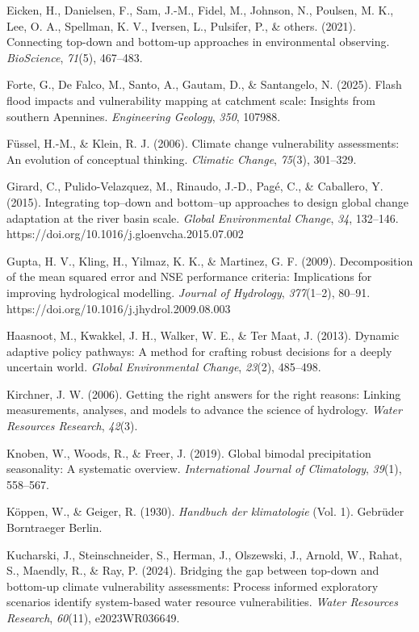 \documentclass[
]{article}
\begin{document}
Eicken, H., Danielsen, F., Sam, J.-M., Fidel, M., Johnson, N., Poulsen,
M. K., Lee, O. A., Spellman, K. V., Iversen, L., Pulsifer, P., \&
others. (2021). Connecting top-down and bottom-up approaches in
environmental observing. \emph{BioScience}, \emph{71}(5), 467--483.

Forte, G., De Falco, M., Santo, A., Gautam, D., \& Santangelo, N.
(2025). Flash flood impacts and vulnerability mapping at catchment
scale: Insights from southern Apennines. \emph{Engineering Geology},
\emph{350}, 107988.

Füssel, H.-M., \& Klein, R. J. (2006). Climate change vulnerability
assessments: An evolution of conceptual thinking. \emph{Climatic
Change}, \emph{75}(3), 301--329.

Girard, C., Pulido-Velazquez, M., Rinaudo, J.-D., Pagé, C., \&
Caballero, Y. (2015). Integrating top--down and bottom--up approaches to
design global change adaptation at the river basin scale. \emph{Global
Environmental Change}, \emph{34}, 132--146.
https://doi.org/10.1016/j.gloenvcha.2015.07.002

Gupta, H. V., Kling, H., Yilmaz, K. K., \& Martinez, G. F. (2009).
Decomposition of the mean squared error and NSE performance criteria:
Implications for improving hydrological modelling. \emph{Journal of
Hydrology}, \emph{377}(1--2), 80--91.
https://doi.org/10.1016/j.jhydrol.2009.08.003

Haasnoot, M., Kwakkel, J. H., Walker, W. E., \& Ter Maat, J. (2013).
Dynamic adaptive policy pathways: A method for crafting robust decisions
for a deeply uncertain world. \emph{Global Environmental Change},
\emph{23}(2), 485--498.

Kirchner, J. W. (2006). Getting the right answers for the right reasons:
Linking measurements, analyses, and models to advance the science of
hydrology. \emph{Water Resources Research}, \emph{42}(3).

Knoben, W., Woods, R., \& Freer, J. (2019). Global bimodal precipitation
seasonality: A systematic overview. \emph{International Journal of
Climatology}, \emph{39}(1), 558--567.

Köppen, W., \& Geiger, R. (1930). \emph{Handbuch der klimatologie} (Vol.
1). Gebrüder Borntraeger Berlin.

Kucharski, J., Steinschneider, S., Herman, J., Olszewski, J., Arnold,
W., Rahat, S., Maendly, R., \& Ray, P. (2024). Bridging the gap between
top-down and bottom-up climate vulnerability assessments: Process
informed exploratory scenarios identify system-based water resource
vulnerabilities. \emph{Water Resources Research}, \emph{60}(11),
e2023WR036649.
\end{document}
